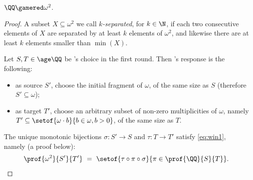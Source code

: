 \begin{lemma} \label{lem:red}
$\QQ \gamered \omega^2$.
\end{lemma}
%
\begin{proof}
%
A subset $X\subseteq \omega^2$ we call \emph{$k$-separated}, for $k\in\N$, if each two consecutive elements
of $X$ are separated by at least $k$ elements of $\omega^2$, and likewise there are at least
$k$ elements smaller than $\min(X)$. 

Let $S, T \in\age \QQ$ be \Spoiler's choice in the first round.
Then \Reducer's response is the following:
\begin{itemize}
\item
as source $S'$, choose
the initial fragment of $\omega$, of the same size as $S$ (therefore
$S' \subseteq \omega$);
\item
as target $T'$, choose an arbitrary 
subset of non-zero multiplicities of $\omega$, namely
$T' \subseteq \setof{\omega\cdot b}{b\in\omega, b>0}$,
of the same size as $T$.
\end{itemize}
The unique monotonic bijections $\sigma : S'\to S$ and $\tau : T \to T'$ satisfy
\eqref{eq:win1}, namely (a proof below):
\begin{align} \label{eq:win1Q}
\prof {\omega^2} {S'} {T'} \ = \ 
\setof{\tau \circ \pi \circ \sigma}{\pi \in \prof {\QQ} {S} {T}}.
\end{align}


\end{proof}

